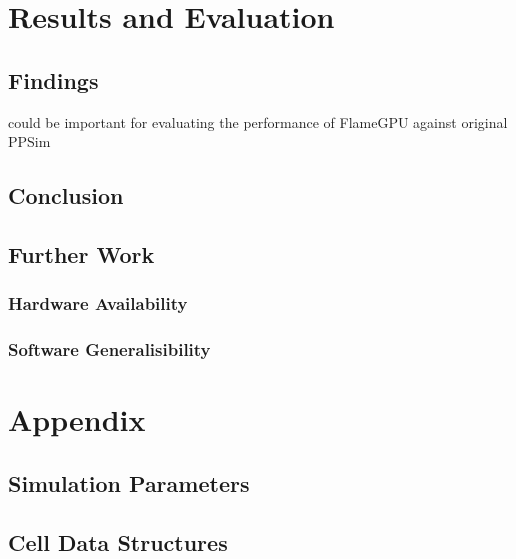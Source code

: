 \documentclass{UoYCSproject}
\begin{document}
\chapter{Results and Evaluation}
\section{Findings}
\cite{statistical_tests} could be important for evaluating the performance of FlameGPU against original PPSim


\section{Conclusion}

\section{Further Work}
\subsection{Hardware Availability}

\subsection{Software Generalisibility}%


\printbibliography

\chapter{Appendix}
\section{Simulation Parameters}


\section{Cell Data Structures}
 
\end{document}
